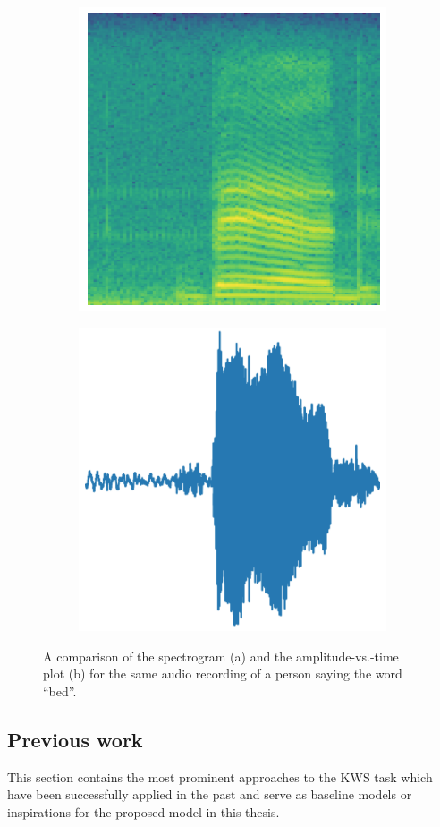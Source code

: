 \documentclass{article}
\theoremstyle{definition}
\theoremstyle{remark}
\begin{document}
\begin{figure}
\centering
\begin{subfigure}{.5\textwidth}
  \centering
  \includegraphics[width=.5\linewidth]{img/papers/image_recognition/spectrogram.png}
  \caption{}
  \label{fig:sub1}
\end{subfigure}%
\begin{subfigure}{.5\textwidth}
  \centering
  \includegraphics[width=.5\linewidth]{img/papers/image_recognition/amplitude_vs_time.png}
  \caption{}
  \label{fig:sub2}
\end{subfigure}
\caption{A comparison of the spectrogram (a) and the
amplitude-vs.-time plot (b) for the same audio recording of
a person saying the word “bed”.}
\label{fig:spectrogram_vs_time_plot}
\end{figure}








\subsection{Previous work}

This section contains the most prominent approaches to the KWS task which have been successfully applied in the past and serve as baseline models or inspirations for the proposed model in this thesis. 
\end{document}

